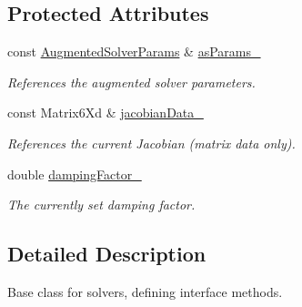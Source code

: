 \subsection*{Protected Attributes}
\begin{DoxyCompactItemize}
\item 
\hypertarget{classConstraintSolver_ab0d5f3ad9e40ebe198a7fbf52ad93f60}{const \hyperlink{structAugmentedSolverParams}{Augmented\-Solver\-Params} \& \hyperlink{classConstraintSolver_ab0d5f3ad9e40ebe198a7fbf52ad93f60}{as\-Params\-\_\-}}\label{classConstraintSolver_ab0d5f3ad9e40ebe198a7fbf52ad93f60}

\begin{DoxyCompactList}\small\item\em References the augmented solver parameters. \end{DoxyCompactList}\item 
\hypertarget{classConstraintSolver_a7c926205c0aed8f7c6d6390a4b84a52d}{const Matrix6\-Xd \& \hyperlink{classConstraintSolver_a7c926205c0aed8f7c6d6390a4b84a52d}{jacobian\-Data\-\_\-}}\label{classConstraintSolver_a7c926205c0aed8f7c6d6390a4b84a52d}

\begin{DoxyCompactList}\small\item\em References the current Jacobian (matrix data only). \end{DoxyCompactList}\item 
\hypertarget{classConstraintSolver_a38e253500733cab242cfe8462963e2e7}{double \hyperlink{classConstraintSolver_a38e253500733cab242cfe8462963e2e7}{damping\-Factor\-\_\-}}\label{classConstraintSolver_a38e253500733cab242cfe8462963e2e7}

\begin{DoxyCompactList}\small\item\em The currently set damping factor. \end{DoxyCompactList}\end{DoxyCompactItemize}


\subsection{Detailed Description}
Base class for solvers, defining interface methods. 


